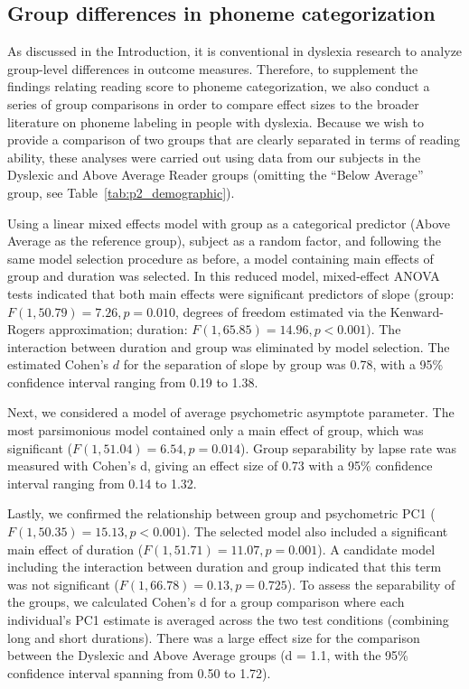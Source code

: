 \documentclass[../uwthesis.tex]{subfiles}
\begin{document}
\subsection{Group differences in phoneme categorization}
As discussed in the Introduction, it is conventional in dyslexia research to analyze group-level differences in outcome measures. Therefore, to supplement the findings relating reading score to phoneme categorization, we also conduct a series of group comparisons in order to compare effect sizes to the broader literature on phoneme labeling in people with dyslexia. Because we wish to provide a comparison of two groups that are clearly separated in terms of reading ability, these analyses were carried out using data from our subjects in the Dyslexic and Above Average Reader groups (omitting the “Below Average” group, see Table~\ref{tab:p2_demographic}). 
 
Using a linear mixed effects model with group as a categorical predictor (Above Average as the reference group), subject as a random factor, and following the same model selection procedure as before, a model containing main effects of group and duration was selected. In this reduced model, mixed-effect ANOVA tests indicated that both main effects were significant predictors of slope (group: $F(1,50.79) = 7.26, p = 0.010$, degrees of freedom estimated via the Kenward-Rogers approximation; duration: $F(1,65.85) = 14.96, p < 0.001$). The interaction between duration and group was eliminated by model selection. The estimated Cohen’s $d$ for the separation of slope by group was 0.78, with a 95\% confidence interval ranging from 0.19 to 1.38.

Next, we considered a model of average psychometric asymptote parameter. The most parsimonious model contained only a main effect of group, which was significant ($F(1, 51.04) = 6.54, p = 0.014$). Group separability by lapse rate was measured with Cohen’s d, giving an effect size of 0.73 with a 95\% confidence interval ranging from 0.14 to 1.32.

Lastly, we confirmed the relationship between group and psychometric PC1 ($F(1,50.35)  = 15.13, p < 0.001$). The selected model also included a significant main effect of duration ($F(1,51.71)  = 11.07, p = 0.001$). A candidate model including the interaction between duration and group indicated that this term was not significant ($F(1,66.78) = 0.13, p = 0.725$). To assess the separability of the groups, we calculated Cohen’s d for a group comparison where each individual’s PC1 estimate is averaged across the two test conditions (combining long and short durations). There was a large effect size for the comparison between the Dyslexic and Above Average groups (d = 1.1, with the 95\% confidence interval spanning from 0.50 to 1.72).
\end{document}
